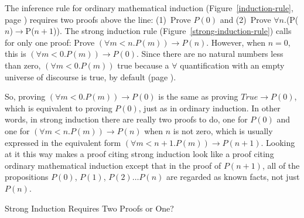 \begin{aside}
The inference rule for ordinary mathematical induction
(Figure~\ref{induction-rule}, page \pageref{induction-rule})
requires two proofs above the line:
(1)~Prove $P(0)$ and (2)~Prove $\forall$$n$.(P($n$)$\rightarrow$P($n+1$)).
The strong induction rule
(Figure~\ref{strong-induction-rule})
calls for only one proof:
Prove $(\forall m<n.P(m))\rightarrow P(n)$.
However, when $n = 0$, this is
$(\forall m<0.P(m))\rightarrow P(0)$.
Since there 
are no natural numbers less than zero,
$(\forall m<0.P(m))$ true because
a $\forall$ quantification with an empty universe of discourse 
is true, by default
(page \pageref{empty-forall}).

So, proving $(\forall m<0.P(m))\rightarrow P(0)$
is the same as proving $True \rightarrow P(0)$,
which is equivalent to proving $P(0)$, 
just as in ordinary induction.
In other words, in strong induction there are really two proofs to do,
one for $P(0)$ and one for $(\forall m<n.P(m))\rightarrow P(n)$
when $n$ is not zero, which is usually expressed in the
equivalent form $(\forall m<n+1.P(m))\rightarrow P(n+1)$.
Looking at it this way makes a proof citing strong induction look like
a proof citing ordinary mathematical induction except that
in the proof of $P(n+1)$, all of the propositions 
$P(0)$, $P(1)$, $P(2) \dots P(n)$
are regarded as known facts, not just $P(n)$.
\caption{Strong Induction Requires Two Proofs or One?}
\label{strong-induction-rule-2-hyps-or-1}
\end{aside}

